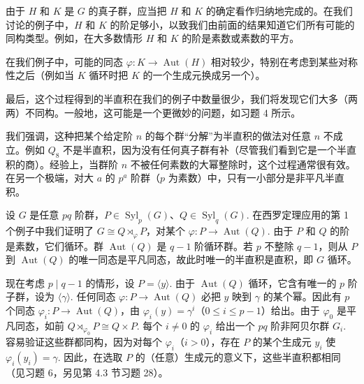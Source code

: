由于 \(H\) 和 \(K\) 是 \(G\) 的真子群，应当把 \(H\) 和 \(K\) 的确定看作归纳地完成的。在我们讨论的例子中，\(H\) 和 \(K\) 的阶足够小，以致我们由前面的结果知道它们所有可能的同构类型。例如，在大多数情形 \(H\) 和 \(K\) 的阶是素数或素数的平方。

在我们例子中，可能的同态 \(\varphi : K \to \operatorname{Aut}(H)\) 相对较少，特别在考虑到某些对称性之后（例如当 \(K\) 循环时把 \(K\) 的一个生成元换成另一个）。

最后，这个过程得到的半直积在我们的例子中数量很少，我们将发现它们大多（两两）不同构。一般地，这可能是一个更微妙的问题，如习题 4 所示。

我们强调，这种把某个给定阶 \(n\) 的每个群“分解”为半直积的做法对任意 \(n\) 不成立。例如 \(Q_8\) 不是半直积，因为没有任何真子群有补（尽管我们看到它是一个半直积的商）。经验上，当群阶 \(n\) 不被任何素数的大幂整除时，这个过程通常很有效。在另一个极端，对大 \(a\) 的 \(p^a\) 阶群（\(p\) 为素数）中，只有一小部分是非平凡半直积。

\begin{example}[\(pq\) 阶群，\(p, q\) 是素数且 \(p < q\)]
设 \(G\) 是任意 \(pq\) 阶群，\(P \in \operatorname{Syl}_p(G)\)、\(Q \in \operatorname{Syl}_q(G)\). 在西罗定理应用的第 1 个例子中我们证明了 \(G \cong Q \rtimes_\varphi P\)，对某个 \(\varphi : P \to \operatorname{Aut}(Q)\). 由于 \(P\) 和 \(Q\) 的阶是素数，它们循环。群 \(\operatorname{Aut}(Q)\) 是 \(q-1\) 阶循环群。若 \(p\) 不整除 \(q-1\)，则从 \(P\) 到 \(\operatorname{Aut}(Q)\) 的唯一同态是平凡同态，故此时唯一的半直积是直积，即 \(G\) 循环。

现在考虑 \(p \mid q-1\) 的情形，设 \(P = \langle y \rangle\). 由于 \(\operatorname{Aut}(Q)\) 循环，它含有唯一的 \(p\) 阶子群，设为 \(\langle \gamma \rangle\). 任何同态 \(\varphi : P \to \operatorname{Aut}(Q)\) 必把 \(y\) 映到 \(\gamma\) 的某个幂。因此有 \(p\) 个同态 \(\varphi_i : P \to \operatorname{Aut}(Q)\)，由 \(\varphi_i(y) = \gamma^i\)（\(0 \leq i \leq p-1\)）给出。由于 \(\varphi_0\) 是平凡同态，如前 \(Q \rtimes_{\varphi_0} P \cong Q \times P\). 每个 \(i \neq 0\) 的 \(\varphi_i\) 给出一个 \(pq\) 阶非阿贝尔群 \(G_i\). 容易验证这些群都同构，因为对每个 \(\varphi_i\)（\(i > 0\)），存在 \(P\) 的某个生成元 \(y_i\) 使 \(\varphi_i(y_i) = \gamma\). 因此，在选取 \(P\) 的（任意）生成元的意义下，这些半直积都相同（见习题 6，另见第 4.3 节习题 28）。
\end{example}

